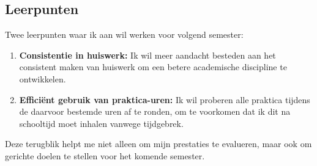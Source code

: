 \subsection{Leerpunten}
Twee leerpunten waar ik aan wil werken voor volgend semester:

\begin{enumerate}
    \item \textbf{Consistentie in huiswerk:} Ik wil meer aandacht besteden aan het consistent maken van huiswerk om een betere academische discipline te ontwikkelen.
    \item \textbf{Efficiënt gebruik van praktica-uren:} Ik wil proberen alle praktica tijdens de daarvoor bestemde uren af te ronden, om te voorkomen dat ik dit na schooltijd moet inhalen vanwege tijdgebrek.
\end{enumerate}

Deze terugblik helpt me niet alleen om mijn prestaties te evalueren, maar ook om gerichte doelen te stellen voor het komende semester.